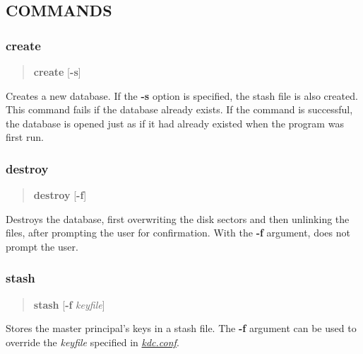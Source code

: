 \documentclass[letterpaper,10pt,english]{sphinxmanual}
\begin{document}
\subsection{COMMANDS}
\label{admin/admin_commands/kdb5_util:commands}\label{admin/admin_commands/kdb5_util:kdb5-util-options-end}

\subsubsection{create}
\label{admin/admin_commands/kdb5_util:create}\label{admin/admin_commands/kdb5_util:kdb5-util-create}\begin{quote}

\textbf{create} {[}\textbf{-s}{]}
\end{quote}

Creates a new database.  If the \textbf{-s} option is specified, the stash
file is also created.  This command fails if the database already
exists.  If the command is successful, the database is opened just as
if it had already existed when the program was first run.


\subsubsection{destroy}
\label{admin/admin_commands/kdb5_util:destroy}\label{admin/admin_commands/kdb5_util:kdb5-util-create-end}\label{admin/admin_commands/kdb5_util:kdb5-util-destroy}\begin{quote}

\textbf{destroy} {[}\textbf{-f}{]}
\end{quote}

Destroys the database, first overwriting the disk sectors and then
unlinking the files, after prompting the user for confirmation.  With
the \textbf{-f} argument, does not prompt the user.


\subsubsection{stash}
\label{admin/admin_commands/kdb5_util:kdb5-util-destroy-end}\label{admin/admin_commands/kdb5_util:stash}\label{admin/admin_commands/kdb5_util:kdb5-util-stash}\begin{quote}

\textbf{stash} {[}\textbf{-f} \emph{keyfile}{]}
\end{quote}

Stores the master principal's keys in a stash file.  The \textbf{-f}
argument can be used to override the \emph{keyfile} specified in
{\hyperref[admin/conf_files/kdc_conf:kdc-conf-5]{\emph{kdc.conf}}}.
\end{document}
